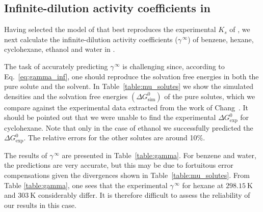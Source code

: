 \documentclass[3p,twocolumn]{elsarticle}
\begin{document}
\subsection{Infinite-dilution activity coefficients in \ce{[emim][B(CN)_4]}}
\label{sec:act_results}

Having selected the model of \ce{[emim][B(CN)_4]} that best reproduces the experimental $K_s$ of , we next calculate the infinite-dilution activity coefficients ($\gamma^{\, \infty}$) of benzene, hexane, cyclohexane, ethanol and water in \ce{[emim][B(CN)_4]}.

The task of accurately predicting $\gamma^{\, \infty}$ is challenging since, according to Eq.~\eqref{eq:gamma_inf}, one should reproduce the solvation free energies in both the pure solute and the solvent.
In Table~\ref{table:mu_solutes} we show the simulated densities and the solvation free energies $(\Delta G^{0}_\text{sim})$ of the pure solutes, which we compare against the experimental data extracted from the work of Chang~\cite{Chang_2009}.
It should be pointed out that we were unable to find the experimental $\Delta G^{0}_\text{exp}$ for cyclohexane.
Note that only in the case of ethanol we successfully predicted the $\Delta G^{0}_\text{exp}$.
The relative errors for the other solutes are around 10\%.

The results of $\gamma^{\, \infty}$ are presented in Table~\ref{table:gamma}.
For benzene and water, the predictions are very accurate, but this may be due to fortuitous error compensations given the divergences shown in Table~\ref{table:mu_solutes}.
From Table \ref{table:gamma}, one sees that the experimental $\gamma^{\, \infty}$ for hexane at $298.15~\text{K}$ and $303~\text{K}$ considerably differ.
It is therefore difficult to assess the reliability of our results in this case.
\end{document}
